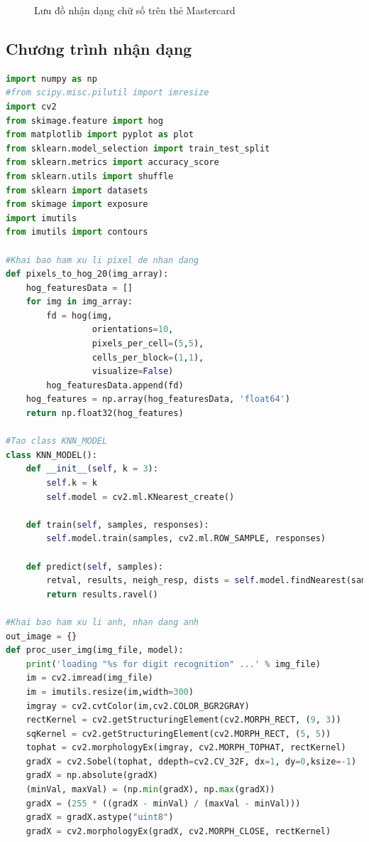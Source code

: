 \begin{figure}[htp]
    \caption{Lưu đồ nhận dạng chữ số trên thẻ Mastercard}
\end{figure}


\subsection{Chương trình nhận dạng}
\begin{lstlisting}[language=Python, caption=Recognition Mastercard]
import numpy as np
#from scipy.misc.pilutil import imresize
import cv2 
from skimage.feature import hog
from matplotlib import pyplot as plot
from sklearn.model_selection import train_test_split
from sklearn.metrics import accuracy_score
from sklearn.utils import shuffle
from sklearn import datasets
from skimage import exposure
import imutils
from imutils import contours

#Khai bao ham xu li pixel de nhan dang
def pixels_to_hog_20(img_array):
    hog_featuresData = []
    for img in img_array:
        fd = hog(img, 
                 orientations=10, 
                 pixels_per_cell=(5,5),
                 cells_per_block=(1,1), 
                 visualize=False)
        hog_featuresData.append(fd)
    hog_features = np.array(hog_featuresData, 'float64')
    return np.float32(hog_features)

#Tao class KNN_MODEL
class KNN_MODEL():
    def __init__(self, k = 3):
        self.k = k
        self.model = cv2.ml.KNearest_create()

    def train(self, samples, responses):
        self.model.train(samples, cv2.ml.ROW_SAMPLE, responses)

    def predict(self, samples):
        retval, results, neigh_resp, dists = self.model.findNearest(samples, self.k)
        return results.ravel()
    
#Khai bao ham xu li anh, nhan dang anh
out_image = {}
def proc_user_img(img_file, model):
    print('loading "%s for digit recognition" ...' % img_file)
    im = cv2.imread(img_file)  
    im = imutils.resize(im,width=300)  
    imgray = cv2.cvtColor(im,cv2.COLOR_BGR2GRAY)
    rectKernel = cv2.getStructuringElement(cv2.MORPH_RECT, (9, 3))
    sqKernel = cv2.getStructuringElement(cv2.MORPH_RECT, (5, 5))
    tophat = cv2.morphologyEx(imgray, cv2.MORPH_TOPHAT, rectKernel)
    gradX = cv2.Sobel(tophat, ddepth=cv2.CV_32F, dx=1, dy=0,ksize=-1)
    gradX = np.absolute(gradX)
    (minVal, maxVal) = (np.min(gradX), np.max(gradX))
    gradX = (255 * ((gradX - minVal) / (maxVal - minVal)))
    gradX = gradX.astype("uint8")
    gradX = cv2.morphologyEx(gradX, cv2.MORPH_CLOSE, rectKernel)
    

\end{lstlisting}
